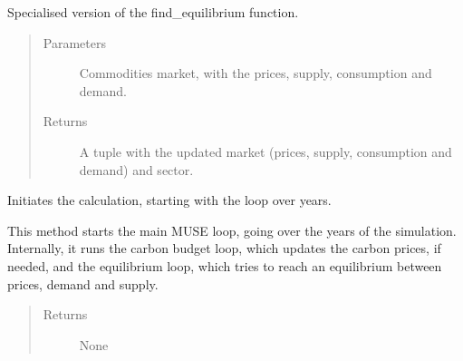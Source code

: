 \documentclass[letterpaper,10pt,english]{sphinxmanual}
\begin{document}
\begin{fulllineitems}
\begin{fulllineitems}
\label{\detokenize{api:muse.mca.MCA.find_equilibrium}}
Specialised version of the find\_equilibrium function.
\begin{quote}\begin{description}
\item[{Parameters}] \leavevmode
{} \textendash{} Commodities market, with the prices, supply, consumption and demand.

\item[{Returns}] \leavevmode
A tuple with the updated market (prices, supply, consumption and demand) and
sector.

\end{description}\end{quote}

\end{fulllineitems}


\begin{fulllineitems}
\label{\detokenize{api:muse.mca.MCA.run}}
Initiates the calculation, starting with the loop over years.

This method starts the main MUSE loop, going over the years of the simulation.
Internally, it runs the carbon budget loop, which updates the carbon prices, if
needed, and the equilibrium loop, which tries to reach an equilibrium between
prices, demand and supply.
\begin{quote}\begin{description}
\item[{Returns}] \leavevmode
None

\end{description}\end{quote}

\end{fulllineitems}



\end{fulllineitems}
\end{document}
